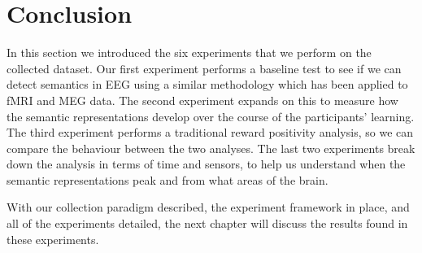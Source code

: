 \section{Conclusion}

In this section we introduced the six experiments that we perform on the 
collected dataset. Our first experiment performs a baseline test to see if we 
can detect semantics in EEG using a similar methodology which has been applied 
to fMRI and MEG data. The second experiment expands on this to measure how the 
semantic representations develop over the course of the participants' learning.  
The third experiment performs a traditional reward positivity analysis, so we 
can compare the behaviour between the two analyses. The last two experiments 
break down the analysis in terms of time and sensors, to help us understand 
when the semantic representations peak and from what areas of the brain.

With our collection paradigm described, the experiment framework in place, and 
all of the experiments detailed, the next chapter will discuss the results 
found in these experiments.
